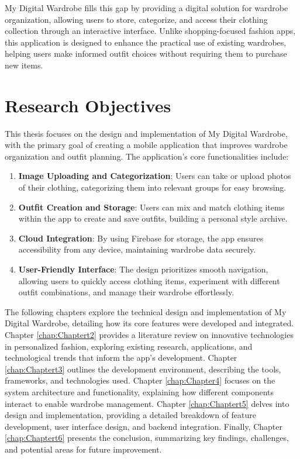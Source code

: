 My Digital Wardrobe fills this gap by providing a digital solution for wardrobe organization, allowing users to store, categorize, and access their clothing collection through an interactive interface. Unlike shopping-focused fashion apps, this application is designed to enhance the practical use of existing wardrobes, helping users make informed outfit choices without requiring them to purchase new items.


\section{Research Objectives}
This thesis focuses on the design and implementation of My Digital Wardrobe, with the primary goal of creating a mobile application that improves wardrobe organization and outfit planning. The application’s core functionalities include:
\begin{enumerate}
 \item \textbf{Image Uploading and Categorization}: Users can take or upload photos of their clothing, categorizing them into relevant groups for easy browsing.
 \item \textbf{Outfit Creation and Storage}: Users can mix and match clothing items within the app to create and save outfits, building a personal style archive.
\item \textbf{Cloud Integration}: By using Firebase for storage, the app ensures accessibility from any device, maintaining wardrobe data securely.
\item \textbf{User-Friendly Interface}: The design prioritizes smooth navigation, allowing users to quickly access clothing items, experiment with different outfit combinations, and manage their wardrobe effortlessly.
\end{enumerate}

The following chapters explore the technical design and implementation of My Digital Wardrobe, detailing how its core features were developed and integrated. Chapter \ref{chap:Chaptert2} provides a literature review on innovative technologies in personalized fashion, exploring existing research, applications, and technological trends that inform the app’s development. Chapter \ref{chap:Chaptert3} outlines the development environment, describing the tools, frameworks, and technologies used. Chapter \ref{chap:Chapter4} focuses on the system architecture and functionality, explaining how different components interact to enable wardrobe management. Chapter \ref{chap:Chaptert5} delves into design and implementation, providing a detailed breakdown of feature development, user interface design, and backend integration. Finally, Chapter \ref{chap:Chaptert6} presents the conclusion, summarizing key findings, challenges, and potential areas for future improvement.


